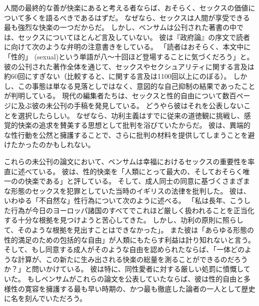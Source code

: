 \documentclass[paper=a4,book,openany]{jlreq}
\begin{document}
人間の最終的な善が快楽にあると考える者ならば、おそらく、セックスの価値について多くを語るべきであるはずだ。
なぜなら、セックスは人間が享受できる最も強烈な快楽の一つだからだ。
しかし、ベンサムは公刊された著書の中では、セックスについてほとんど言及していない。
彼は『政府論』の序文で読者に向けて次のような弁明の注意書きをしている。
「読者はおそらく、本文中に「性的」 (sexual)という単語が八〜十回ほど登場することに気づくだろう」と\citep[p.533]{bentham77:_commen_commen_fragm_gover}。
彼の公刊された著作全体を通じて、セックスやセクシュアリティに関する言及は約60回にすぎない（比較すると、に関する言及は1100回以上にのぼる）。
しかし、この事態は単なる見落としではなく、意図的な自己抑制の結果であったことが判明している。
現代の編集者たちは、セックスと性的自由について数百ページに及ぶ彼の未公刊の手稿を発見している。
どうやら彼はそれを公表しないことを選択したらしい。
なぜなら、功利主義はすでに従来の道徳観に挑戦し、感覚的快楽の追求を賛美する思想として批判を浴びていたからだ。
彼は、異端的な性行動を公然と擁護することで、さらに批判の材料を提供してしまうことを避けたかったのかもしれない。

これらの未公刊の論文において、ベンサムは幸福におけるセックスの重要性を率直に述べている。
彼は、性的快楽を「人類にとって最大の、そしておそらく唯一のの快楽である」と評している。
そして、成人同士の同意に基づくさまざまな形態のセックスを犯罪としていた当時のイギリスの法律を批判した。
彼は、いわゆる「不自然な」性行為について次のように述べる。
「私は長年、こうした行為が今日のヨーロッパ諸国のすべてでこれほど厳しく扱われることを正当化する十分な根拠を見つけようと苦心してきた。
しかし、功利の原則に照らして、そのような根拠を見出すことはできなかった」。
また彼は「あらゆる形態の性的満足のための包括的な自由」が人類にもたらす利益は計り知れないと言う。
そして、もし同意する成人がそのような自由を認められたならば、「一体どのような計算が、この新たに生み出される快楽の総量を測ることができるのだろうか？」と問いかけている。
彼は特に、同性愛者に対する厳しい処罰に憤慨していた。
もしベンサムがこれらの論文を公表していたならば、彼は性的自由と多様性の寛容を擁護する最も早い時期の、かつ最も徹底した論者の一人として歴史に名を刻んでいただろう。
\end{document}
